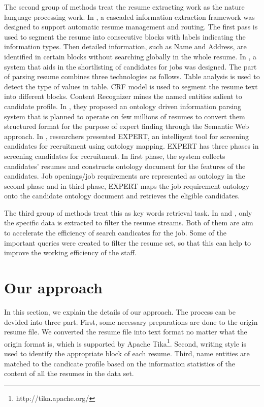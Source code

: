 \documentclass{acm_proc_article-sp}
\begin{document}
The second group of methods treat the resume extracting work as the nature language processing work. 
In \cite{Yu:2005:RIE:1219840.1219902}, a cascaded information extraction framework was designed to support automatic resume management and routing.
The first pass is used to segment the resume into consecutive blocks with labels indicating the information types. 
Then detailed information, such as Name and Address, are identified in certain blocks without searching globally in the whole resume.
In \cite{Singh:2010:PSS:1871437.1871523}, a system that aids in the shortlisting of candidates for jobs was designed. 
The part of parsing resume combines three technologies as follows.
Table analysis is used to detect the type of values in table. 
CRF model is used to segment the resume text into different blocks. 
Content Recognizer mines the named entities salient to candidate profile.
In \cite{Celik:2012:OIE:2456270.2456284}, they proposed an ontology driven information parsing system that is planned to operate on few millions of resumes to convert them structured format for the purpose of expert finding through the Semantic Web approach.
In \cite{kumaran2013towards}, researchers presented EXPERT, an intelligent tool for screening candidates for recruitment using ontology mapping. EXPERT has three phases in screening candidates for recruitment. In first phase, the system collects candidates' resumes and constructs ontology document for the features of the candidates. Job openings/job requirements are represented as ontology in the second phase and in third phase, EXPERT maps the job requirement ontology onto the candidate ontology document and retrieves the eligible candidates.

The third group of methods treat this as key words retrieval task.
In \cite{kopparapu2010automatic} and \cite{maheshwari2010approach}, only the specific data is extracted to filter the resume streams. 
Both of them are aim to accelerate the efficiency of search candicates for the job.
Some of the important queries were created to filter the resume set, so that this can help to improve the working efficiency of the staff.




\section{Our approach}\label{our-approach}

In this section, we explain the details of our approach. 
The process can be devided into three part. 
First, some necessary preparations are done to the origin resume file. 
We converted the resume file into text format no matter what the origin format is, which is supported by Apache Tika\footnote{http://tika.apache.org/}. 
Second, writing style is used to identify the appropriate  block of each resume.
Third, name entities are matched to the candicate profile based on the information statistics of the content of all the resumes in the data set. 
\end{document}
